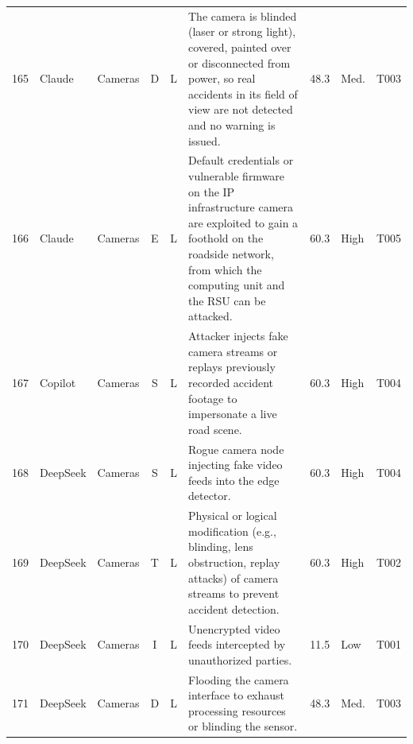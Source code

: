 \documentclass[9pt]{extarticle}
\begin{document}
\begin{longtable}{r l >{\raggedright\arraybackslash}p{2.6cm} c c >{\raggedright\arraybackslash}p{8.1cm} r l l}
165 & Claude & Cameras & D & L & The camera is blinded (laser or strong light), covered, painted over or disconnected from power, so real accidents in its field of view are not detected and no warning is issued. & 48.3 & Med. & T003 \\
166 & Claude & Cameras & E & L & Default credentials or vulnerable firmware on the IP infrastructure camera are exploited to gain a foothold on the roadside network, from which the computing unit and the RSU can be attacked. & 60.3 & High & T005 \\
167 & Copilot & Cameras & S & L & Attacker injects fake camera streams or replays previously recorded accident footage to impersonate a live road scene. & 60.3 & High & T004 \\
168 & DeepSeek & Cameras & S & L & Rogue camera node injecting fake video feeds into the edge detector. & 60.3 & High & T004 \\
169 & DeepSeek & Cameras & T & L & Physical or logical modification (e.g., blinding, lens obstruction, replay attacks) of camera streams to prevent accident detection. & 60.3 & High & T002 \\
170 & DeepSeek & Cameras & I & L & Unencrypted video feeds intercepted by unauthorized parties. & 11.5 & Low & T001 \\
171 & DeepSeek & Cameras & D & L & Flooding the camera interface to exhaust processing resources or blinding the sensor. & 48.3 & Med. & T003 \\
\end{longtable}
\end{document}
